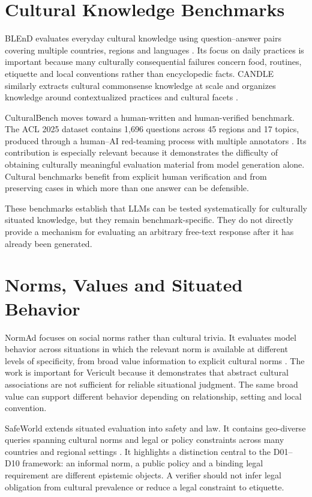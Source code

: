 \section{Cultural Knowledge Benchmarks}

BLEnD evaluates everyday cultural knowledge using question--answer pairs covering multiple countries, regions and languages \parencite{myung2024blend}. Its focus on daily practices is important because many culturally consequential failures concern food, routines, etiquette and local conventions rather than encyclopedic facts. CANDLE similarly extracts cultural commonsense knowledge at scale and organizes knowledge around contextualized practices and cultural facets \parencite{nguyen2023candle}.

CulturalBench moves toward a human-written and human-verified benchmark. The ACL 2025 dataset contains 1,696 questions across 45 regions and 17 topics, produced through a human--AI red-teaming process with multiple annotators \parencite{chiu2025culturalbench}. Its contribution is especially relevant because it demonstrates the difficulty of obtaining culturally meaningful evaluation material from model generation alone. Cultural benchmarks benefit from explicit human verification and from preserving cases in which more than one answer can be defensible.

These benchmarks establish that LLMs can be tested systematically for culturally situated knowledge, but they remain benchmark-specific. They do not directly provide a mechanism for evaluating an arbitrary free-text response after it has already been generated.

\section{Norms, Values and Situated Behavior}

NormAd focuses on social norms rather than cultural trivia. It evaluates model behavior across situations in which the relevant norm is available at different levels of specificity, from broad value information to explicit cultural norms \parencite{rao2025normad}. The work is important for Vericult because it demonstrates that abstract cultural associations are not sufficient for reliable situational judgment. The same broad value can support different behavior depending on relationship, setting and local convention.

SafeWorld extends situated evaluation into safety and law. It contains geo-diverse queries spanning cultural norms and legal or policy constraints across many countries and regional settings \parencite{yin2024safeworld}. It highlights a distinction central to the D01--D10 framework: an informal norm, a public policy and a binding legal requirement are different epistemic objects. A verifier should not infer legal obligation from cultural prevalence or reduce a legal constraint to etiquette.

